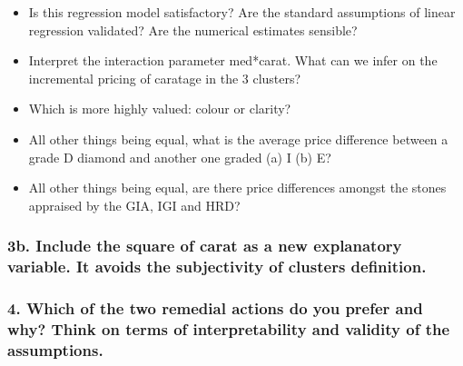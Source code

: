\documentclass[]{article}
\begin{document}
\begin{itemize}
\item
  Is this regression model satisfactory? Are the standard assumptions of
  linear regression validated? Are the numerical estimates sensible?
\item
  Interpret the interaction parameter med*carat. What can we infer on
  the incremental pricing of caratage in the 3 clusters?
\item
  Which is more highly valued: colour or clarity?
\item
  All other things being equal, what is the average price difference
  between a grade D diamond and another one graded (a) I (b) E?
\item
  All other things being equal, are there price differences amongst the
  stones appraised by the GIA, IGI and HRD?
\end{itemize}

\subsubsection{3b. Include the square of carat as a new explanatory
variable. It avoids the subjectivity of clusters
definition.}\label{b.-include-the-square-of-carat-as-a-new-explanatory-variable.-it-avoids-the-subjectivity-of-clusters-definition.}

\subsubsection{4. Which of the two remedial actions do you prefer and
why? Think on terms of interpretability and validity of the
assumptions.}\label{which-of-the-two-remedial-actions-do-you-prefer-and-why-think-on-terms-of-interpretability-and-validity-of-the-assumptions.}
\end{document}
